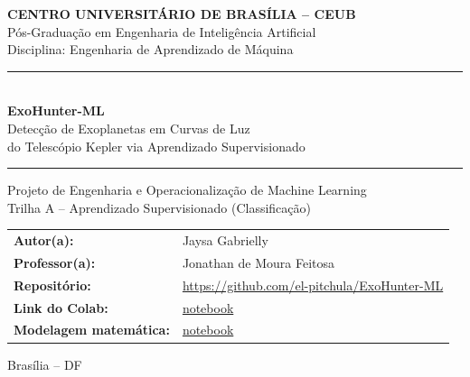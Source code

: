 \documentclass[12pt,a4paper]{article}
\begin{document}
\begin{titlepage}
\begin{center}

\vspace*{1.5cm}

{\Large \bfseries CENTRO UNIVERSITÁRIO DE BRASÍLIA -- CEUB}\\[0.3cm]
{\large Pós-Graduação em Engenharia de Inteligência Artificial}\\[0.2cm]
{\large Disciplina: Engenharia de Aprendizado de Máquina}

\vspace{2.5cm}

\rule{\linewidth}{0.5pt}\\[0.5cm]
{\Huge \bfseries ExoHunter-ML}\\[0.4cm]
{\Large Detecção de Exoplanetas em Curvas de Luz\\ do Telescópio Kepler via Aprendizado Supervisionado}\\[0.5cm]
\rule{\linewidth}{0.5pt}

\vspace{1.5cm}

{\large Projeto de Engenharia e Operacionalização de Machine Learning}\\[0.3cm]
{\large Trilha A -- Aprendizado Supervisionado (Classificação)}

\vspace{3cm}

\begin{tabular}{ll}
\textbf{Autor(a):} & Jaysa Gabrielly \\[0.2cm]
\textbf{Professor(a):} & Jonathan de Moura Feitosa \\[0.2cm]
\textbf{Repositório:} & \url{https://github.com/el-pitchula/ExoHunter-ML} \\[0.2cm]
\textbf{Link do Colab:} & \href{https://colab.research.google.com/drive/1hIk7K1Vod68CgRqxU7ApXS6xHVQwsmf4?usp=sharing}{notebook} \\[0.2cm]
\textbf{Modelagem matemática:} & \href{https://colab.research.google.com/drive/1anHAKn8FQQ9Zok4hykcavm5CGYpA2acC?usp=sharing}{notebook} \\
\end{tabular}

\vfill

{\large Brasília -- DF}\\
{\large \the\year}

\end{center}
\end{titlepage}
\end{document}
